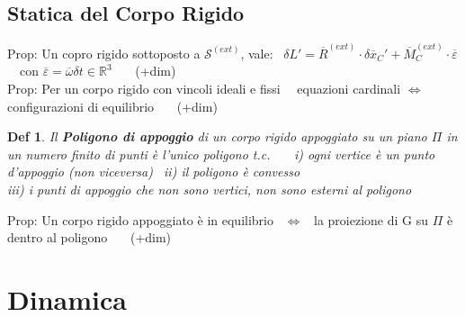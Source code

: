 \documentclass{article}
\theoremstyle{unnumbered}
\newtheorem* {theoremT}{Def}
\theoremstyle{unnumbered1}
\newenvironment{defi}{\begin{gBox}\begin{theoremT}}{\end{theoremT}\end{gBox}}
\begin{document}
\subsection{Statica del Corpo Rigido}
%
Prop: Un copro rigido sottoposto a $\mathcal{S}^{(ext)}$, vale: \  $\delta L' = \overline{R}^{(ext)}\cdot\delta\overline{x}_C' + \overline{M}_C^{(ext)}\cdot\overline{\varepsilon} $ \ \ con $\overline{\varepsilon}=\overline{\omega}\delta t \in \mathbb{R}^3$ \ \ \ (+dim)\\
Prop: Per un corpo rigido con vincoli ideali e fissi \ \ equazioni cardinali $\Leftrightarrow$ configurazioni di equilibrio \ \ \ (+dim)\\
%
%
%
\begin{defi}
Il \textbf{Poligono di appoggio} di un corpo rigido appoggiato su un piano $\Pi$ in un numero finito di punti è l'unico poligono t.c. \ \ \ i) ogni vertice è un punto d'appoggio (non viceversa) \ ii) il poligono è convesso  \\
\phantom{} \hspace{1.4in} iii) i punti di appoggio che non sono vertici, non sono esterni al poligono
\end{defi}
%
Prop: Un corpo rigido appoggiato è in equilibrio \ $\Leftrightarrow$ \ la proiezione di G su $\Pi$ è dentro al poligono \ \ \ (+dim)\\

\newpage





%
%

\section{Dinamica}
\end{document}
